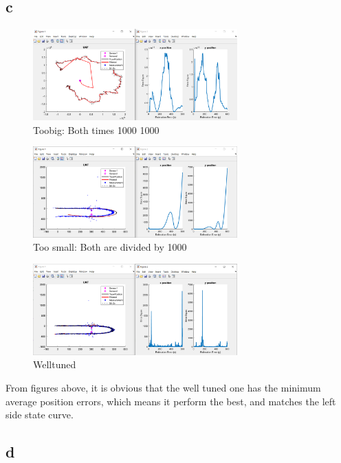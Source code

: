 \subsection{c}

\begin{figure}[H]
 \centering
 \includegraphics[width=0.7\textwidth]{images/toobig.png}
 \caption{Toobig: Both times 1000 1000}
 \label{toobig}
\end{figure}

\begin{figure}[H]
 \centering
 \includegraphics[width=0.7\textwidth]{images/toosmall.png}
 \caption{Too small: Both are divided by 1000}
 \label{toosmall}
\end{figure}

\begin{figure}[H]
 \centering
 \includegraphics[width=0.7\textwidth]{images/welltuned.png}
 \caption{Welltuned}
 \label{welltune}
\end{figure}

From figures above, it is obvious that the well tuned one has the minimum average position errors, which means it perform the best, and matches the left side state curve.

\subsection{d}


